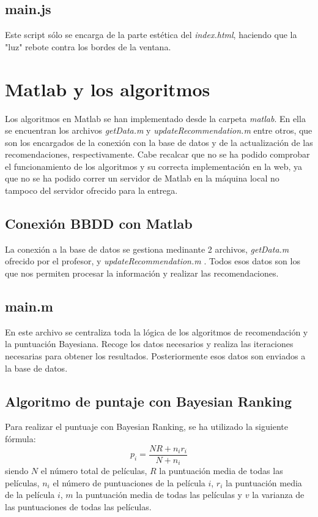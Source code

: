 \documentclass[a4paper, 12pt]{report}
\begin{document}
    \section{main.js}
    Este script sólo se encarga de la parte estética del \textit{index.html}, haciendo que la "luz" rebote contra los bordes de la ventana.

    \chapter{Matlab y los algoritmos}
    Los algoritmos en Matlab se han implementado desde la carpeta \textit{matlab}. En ella se encuentran los archivos \textit{getData.m} y \textit{updateRecommendation.m} entre otros, que son los encargados de la conexión con la base de datos y de la actualización de las recomendaciones, respectivamente.
    Cabe recalcar que no se ha podido comprobar el funcionamiento de los algoritmos y su correcta implementación en la web, ya que no se ha podido correr un servidor de Matlab en la máquina local no tampoco del servidor ofrecido para la entrega.
    \section{Conexión BBDD con Matlab}
    La conexión a la base de datos se gestiona medinante 2 archivos, \textit{getData.m} ofrecido por el profesor, y \textit{updateRecommendation.m} . Todos esos datos son los que nos permiten procesar la información y realizar las recomendaciones.
    \section{main.m}
    En este archivo se centraliza toda la lógica de los algoritmos de recomendación y la puntuación Bayesiana. Recoge los datos necesarios y realiza las iteraciones necesarias para obtener los resultados. Posteriormente esos datos son enviados a la base de datos.
    \section{Algoritmo de puntaje con Bayesian Ranking}
    Para realizar el puntuaje con Bayesian Ranking, se ha utilizado la siguiente fórmula:
    \begin{equation}
        p_i = \frac{NR+n_ir_i}{N+n_i}
    \end{equation}    siendo $N$ el número total de películas, $R$ la puntuación media de todas las películas, $n_i$ el número de puntuaciones de la película $i$, $r_i$ la puntuación media de la película $i$, $m$ la puntuación media de todas las películas y $v$ la varianza de las puntuaciones de todas las películas.
    \newpage


    \printbibliography
\end{document}

